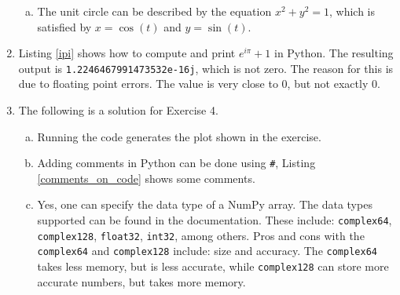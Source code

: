 \begin{enumerate}
\begin{enumerate}[a)]
\item The unit circle can be described by the equation $x^{2} + y^{2} = 1$, which is satisfied by $x=\cos(t)$ and $y =\sin(t)$. 
\end{enumerate}


\item Listing \ref{ipi} shows how to compute and print $e^{i\pi}+1$ in Python. The resulting output is \verb|1.2246467991473532e-16j|, which is not zero.
The reason for this is due to floating point errors. The value is very close to 0, but not exactly 0. 



\item The following is a solution for Exercise 4.

\begin{enumerate}[a)]
\item Running the code generates the plot shown in the exercise. 

\item Adding comments in Python can be done using \verb|#|, Listing \ref{comments_on_code} shows some comments.


\item Yes, one can specify the data type of a NumPy array. The data types supported can be found in the documentation. 
These include: \verb|complex64|, \verb|complex128|, \verb|float32|, \verb|int32|, among others. 
Pros and cons with the \verb|complex64| and \verb|complex128| include: size and accuracy. The \verb|complex64|
takes less memory, but is less accurate, while \verb|complex128| can store more accurate numbers, but takes more memory.

\end{enumerate}





\end{enumerate}